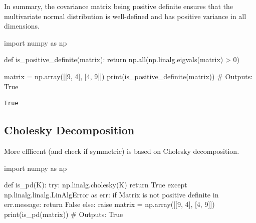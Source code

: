 \documentclass[
  letterpaper,
  DIV=11,
  numbers=noendperiod]{scrreprt}
\newenvironment{Shaded}{\begin{snugshade}}{\end{snugshade}}
\newcommand{\BuiltInTok}[1]{\textcolor[rgb]{0.00,0.23,0.31}{#1}}
\newcommand{\CommentTok}[1]{\textcolor[rgb]{0.37,0.37,0.37}{#1}}
\newcommand{\ControlFlowTok}[1]{\textcolor[rgb]{0.00,0.23,0.31}{#1}}
\newcommand{\DecValTok}[1]{\textcolor[rgb]{0.68,0.00,0.00}{#1}}
\newcommand{\ImportTok}[1]{\textcolor[rgb]{0.00,0.46,0.62}{#1}}
\newcommand{\KeywordTok}[1]{\textcolor[rgb]{0.00,0.23,0.31}{#1}}
\newcommand{\NormalTok}[1]{\textcolor[rgb]{0.00,0.23,0.31}{#1}}
\newcommand{\OperatorTok}[1]{\textcolor[rgb]{0.37,0.37,0.37}{#1}}
\newcommand{\StringTok}[1]{\textcolor[rgb]{0.13,0.47,0.30}{#1}}
\newcommand{\VariableTok}[1]{\textcolor[rgb]{0.07,0.07,0.07}{#1}}
\begin{document}
In summary, the covariance matrix being positive definite ensures that
the multivariate normal distribution is well-defined and has positive
variance in all dimensions.

\begin{Shaded}
\begin{Highlighting}[]
\ImportTok{import}\NormalTok{ numpy }\ImportTok{as}\NormalTok{ np}

\KeywordTok{def}\NormalTok{ is\_positive\_definite(matrix):}
    \ControlFlowTok{return}\NormalTok{ np.}\BuiltInTok{all}\NormalTok{(np.linalg.eigvals(matrix) }\OperatorTok{\textgreater{}} \DecValTok{0}\NormalTok{)}

\NormalTok{matrix }\OperatorTok{=}\NormalTok{ np.array([[}\DecValTok{9}\NormalTok{, }\DecValTok{4}\NormalTok{], [}\DecValTok{4}\NormalTok{, }\DecValTok{9}\NormalTok{]])}
\BuiltInTok{print}\NormalTok{(is\_positive\_definite(matrix))  }\CommentTok{\# Outputs: True}
\end{Highlighting}
\end{Shaded}

\begin{verbatim}
True
\end{verbatim}

\hypertarget{cholesky-decomposition}{%
\subsection{Cholesky Decomposition}\label{cholesky-decomposition}}

More effficent (and check if symmetric) is based on Cholesky
decomposition.

\begin{Shaded}
\begin{Highlighting}[]
\ImportTok{import}\NormalTok{ numpy }\ImportTok{as}\NormalTok{ np}

\KeywordTok{def}\NormalTok{ is\_pd(K):}
    \ControlFlowTok{try}\NormalTok{:}
\NormalTok{        np.linalg.cholesky(K)}
        \ControlFlowTok{return} \VariableTok{True}
    \ControlFlowTok{except}\NormalTok{ np.linalg.linalg.LinAlgError }\ImportTok{as}\NormalTok{ err:}
        \ControlFlowTok{if} \StringTok{\textquotesingle{}Matrix is not positive definite\textquotesingle{}} \KeywordTok{in}\NormalTok{ err.message:}
            \ControlFlowTok{return} \VariableTok{False}
        \ControlFlowTok{else}\NormalTok{:}
            \ControlFlowTok{raise}
\NormalTok{matrix }\OperatorTok{=}\NormalTok{ np.array([[}\DecValTok{9}\NormalTok{, }\DecValTok{4}\NormalTok{], [}\DecValTok{4}\NormalTok{, }\DecValTok{9}\NormalTok{]])}
\BuiltInTok{print}\NormalTok{(is\_pd(matrix))  }\CommentTok{\# Outputs: True}
\end{Highlighting}
\end{Shaded}
\end{document}
